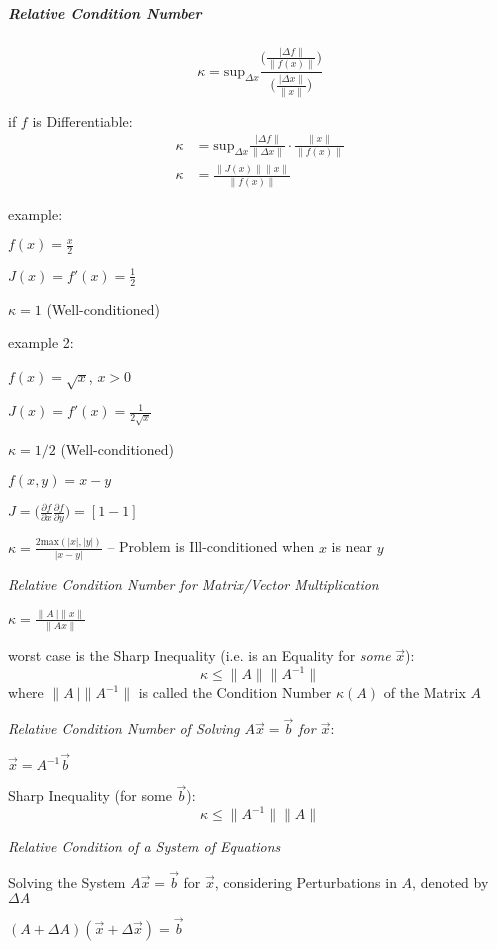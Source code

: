 \subparagraph{Relative Condition Number}\label{sec:relative_condition_number}
\hfill

\[
  \kappa = \mathrm{sup}_{\Delta x} \frac{
    \Big(\frac{\ |\Delta f\|}{\|f(x)\|}\Big)
  }{
    \Big(\frac{\ |\Delta x\|}{\|x\|}\Big)
  }
\]

if $f$ is Differentiable:
\begin{align*}
  \kappa & = \mathrm{sup}_{\Delta x}
    \frac{\ |\Delta f\|}{\|\Delta x\|} \cdot \frac{\|x\|}{\|f(x)\|} \\
  \kappa & = \frac{\|J(x)\| \|x\|}{\|f(x)\|}
\end{align*}

example:

$f(x) = \frac{x}{2}$

$J(x) = f'(x) = \frac{1}{2}$

$\kappa = 1$ (Well-conditioned)

example 2:

$f(x) = \sqrt x$, $x > 0$

$J(x) = f'(x) = \frac{1}{2\sqrt{x}}$

$\kappa = 1/2$ (Well-conditioned)

$f(x,y) = x - y$

$J = \Big(
  \frac{\partial{f}}{\partial{x}}
  \frac{\partial{f}}{\partial{y}}
\Big) = [1 -1]$

$\kappa = \frac{2 \mathrm{max}(|x|,|y|)}{|x - y|}$ --
Problem is Ill-conditioned when $x$ is near $y$


\emph{Relative Condition Number for Matrix/Vector Multiplication}

$\kappa = \frac{\|A\ |\|x\|}{\|Ax\|}$

worst case is the Sharp Inequality (i.e. is an Equality for \emph{some}
$\vec{x}$):
\[
  \kappa \leq \|A\| \|A^{-1}\|
\]
where $\|A\ |\|A^{-1}\|$ is called the Condition Number $\kappa(A)$ of the
Matrix $A$


\emph{Relative Condition Number of Solving $A\vec{x} = \vec{b}$ for $\vec{x}$}:

$\vec{x} = A^{-1}\vec{b}$

Sharp Inequality (for some $\vec{b}$):
\[
  \kappa \leq \|A^{-1}\| \|A\|
\]


\emph{Relative Condition of a System of Equations}

Solving the System $A\vec{x} = \vec{b}$ for $\vec{x}$, considering
Perturbations in $A$, denoted by $\Delta A$

$(A + \Delta A)(\vec{x} + \Delta\vec{x}) = \vec{b}$

